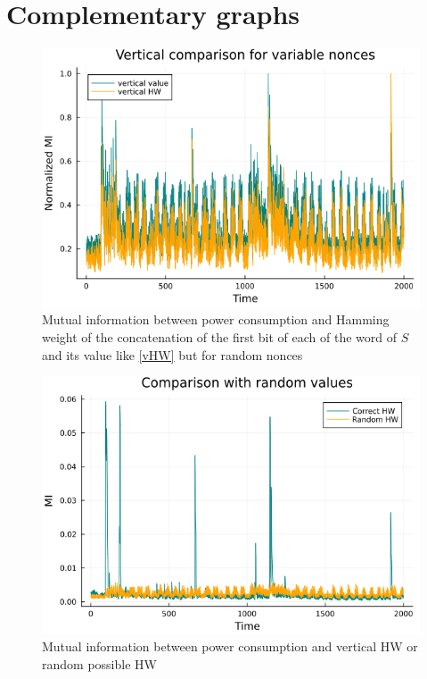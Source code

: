 \documentclass[11pt,technote]{IEEEtran}
\begin{document}
	\section{Complementary graphs}
	\begin{figure}[H]
		\centering
		\includegraphics[scale=0.3]{img_files/vertical_one_byte}
		\caption{Mutual information between power consumption and Hamming weight of the concatenation of the first bit of each of the word of $S$ and its value like \ref{vHW} but for random nonces}
		\label{vHW&val}
	\end{figure}
	
	\begin{figure}[H]
		\centering
		\includegraphics[scale=0.3]{img_files/HWalea}
		\caption{Mutual information between power consumption and vertical HW or random possible HW}
		\label{HWalea}
	\end{figure}
	
\end{document}
